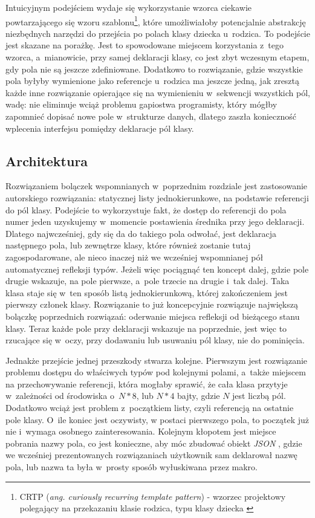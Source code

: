 \documentclass[12pt]{article}
\newcommand{\n}{\newline}
\newcommand{\nonpl}[1]{{\it #1}}
\newcommand{\ang}[1]{\nonpl{ang. #1}}
\newcommand{\JSON}{\nonpl{JSON} }
\begin{document}
{{			Intuicyjnym podejściem wydaje się wykorzystanie wzorca ciekawie powtarzającego się wzoru szablonu\footnote{
				CRTP (\ang{curiously recurring template pattern}) - wzorzec projektowy polegający na przekazaniu klasie rodzica, typu klasy dziecka \cite{crtp_definition}
			}, które umożliwiałoby potencjalnie abstrakcję niezbędnych narzędzi do przejścia po polach klasy dziecka u~rodzica. To podejście jest skazane na
			porażkę. Jest to spowodowane miejscem korzystania z~tego wzorca, a~mianowicie, przy samej deklaracji klasy, co jest zbyt wczesnym etapem, gdy pola nie są
			jeszcze zdefiniowane. Dodatkowo to rozwiązanie, gdzie wszystkie pola byłyby wymienione jako referencje u~rodzica ma jeszcze jedną, jak zresztą każde
			inne rozwiązanie opierające się na wymienieniu w~sekwencji wszystkich pól, wadę: nie eliminuje wciąż problemu gapiostwa programisty, który mógłby zapomnieć
			dopisać nowe pole w~strukturze danych, dlatego zaszła konieczność wplecenia interfejsu pomiędzy deklaracje pól klasy.
		}

		{
			\subsection{Architektura}

			Rozwiązaniem bolączek wspomnianych w~poprzednim rozdziale jest zastosowanie autorskiego rozwiązania: statycznej listy jednokierunkowe, na podstawie
			referencji do pól klasy. Podejście to wykorzystuje fakt, że dostęp do referencji do pola numer jeden uzyskujemy w~momencie postawienia średnika przy jego deklaracji.
			Dlatego najwcześniej, gdy się da do takiego pola odwołać, jest deklaracja następnego pola, lub zewnętrze klasy, które również zostanie tutaj zagospodarowane,
			ale nieco inaczej niż we wcześniej wspomnianej pół automatycznej refleksji typów. Jeżeli więc pociągnąć ten koncept dalej, gdzie pole drugie wskazuje, na
			pole pierwsze, a~pole trzecie na drugie i~tak dalej. Taka klasa staje się w~ten sposób listą jednokierunkową, której zakończeniem jest pierwszy członek klasy.
			Rozwiązanie to już koncepcyjnie rozwiązuje największą bolączkę poprzednich rozwiązań: oderwanie miejsca refleksji od bieżącego stanu klasy.
			Teraz każde pole przy deklaracji wskazuje na poprzednie, jest więc to rzucające się w~oczy, przy dodawaniu lub usuwaniu pól klasy, nie do pominięcia.\n

			Jednakże przejście jednej przeszkody stwarza kolejne. Pierwszym jest rozwiązanie problemu dostępu do właściwych typów pod kolejnymi polami, a~także
			miejscem na przechowywanie referencji, która mogłaby sprawić, że cała klasa przytyje w~zależności od środowiska o~$N * 8$, lub $N * 4$ bajty,
			gdzie $N$ jest liczbą pól. Dodatkowo wciąż jest problem z~początkiem listy, czyli referencją na ostatnie pole klasy. O~ile koniec jest oczywisty,
			w postaci pierwszego pola, to początek już nie i~wymaga osobnego zainteresowania. Kolejnym kłopotem jest miejsce pobrania nazwy pola, co jest
			konieczne, aby móc zbudować obiekt \JSON, gdzie we wcześniej prezentowanych rozwiązaniach użytkownik sam deklarował nazwę pola, lub nazwa ta
			była w~prosty sposób wyłuskiwana przez makro.\n

}}
\end{document}

